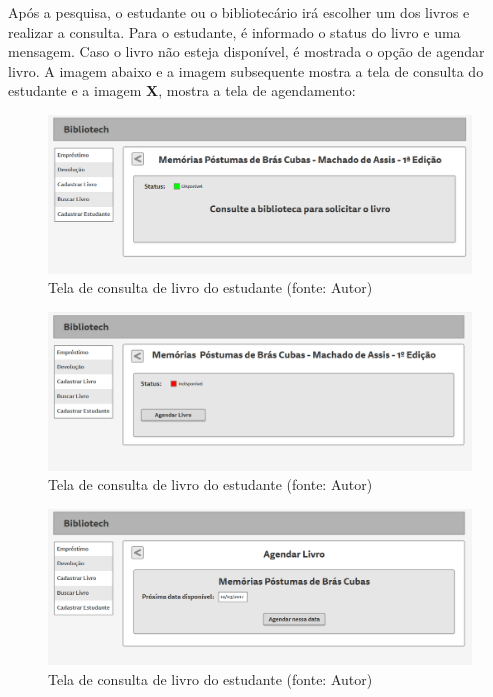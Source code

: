 Após a pesquisa, o estudante ou o bibliotecário irá escolher um dos livros e realizar a consulta. Para o estudante, é informado o status do livro e uma mensagem. Caso o livro não esteja disponível, é mostrada o opção de  agendar livro. A imagem abaixo e a imagem subsequente mostra a tela de consulta do estudante e a imagem \textbf{X}, mostra a tela de agendamento:

\begin{figure}[!h]
\centering
\includegraphics[scale=0.40, angle = 360]{figuras/prototipo6}
\caption[]{Tela de consulta de livro do estudante (fonte: Autor)}
\end{figure}
\FloatBarrier

\begin{figure}[!h]
\centering
\includegraphics[scale=0.40, angle = 360]{figuras/prototipo7}
\caption[]{Tela de consulta de livro do estudante (fonte: Autor)}
\end{figure}
\FloatBarrier

\begin{figure}[!h]
\centering
\includegraphics[scale=0.40, angle = 360]{figuras/prototipo8}
\caption[]{Tela de consulta de livro do estudante (fonte: Autor)}
\end{figure}
\FloatBarrier

